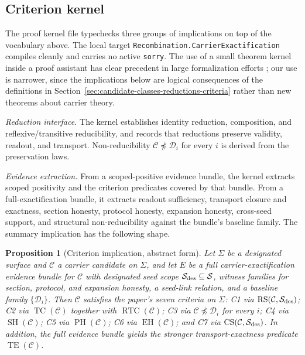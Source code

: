 \documentclass[11pt]{article}
\newtheorem{proposition}[theorem]{Proposition}
\theoremstyle{definition}
\begin{document}
\subsection{Criterion kernel}

The proof kernel file typechecks three groups of implications on top of the
vocabulary above. The local target
\nolinkurl{Recombination.CarrierExactification} compiles cleanly and carries no
active \texttt{sorry}. The use of a small theorem kernel inside a proof assistant
has clear precedent in large formalization efforts \citep{Gonthier2008}; our use is
narrower, since the implications below are
logical consequences of the definitions in
Section~\ref{sec:candidate-classes-reductions-criteria} rather than new theorems
about carrier theory.

\emph{Reduction interface.} The kernel establishes identity reduction,
composition, and reflexive/transitive reducibility, and records that reductions
preserve validity, readout, and transport. Non-reducibility $\mathcal{C}
\not\preceq \mathcal{D}_i$ for every $i$ is derived from the preservation laws.

\emph{Evidence extraction.} From a scoped-positive evidence bundle, the kernel
extracts scoped positivity and the criterion predicates covered by that bundle.
From a full-exactification bundle, it extracts readout sufficiency, transport
closure and exactness, section honesty, protocol honesty, expansion honesty,
cross-seed support, and structural non-reducibility against the bundle's
baseline family. The summary implication has the following shape.

\begin{proposition}[Criterion implication, abstract form]
\label{prop:criterion-implication}
Let $\Sigma$ be a designated surface and $\mathcal{C}$ a carrier candidate on
$\Sigma$, and let $E$ be a full carrier-exactification evidence bundle for
$\mathcal{C}$ with designated seed scope
$\mathcal{S}_{\textup{des}} \subseteq \mathcal{S}$, witness families for section,
protocol, and expansion honesty, a seed-link relation, and a baseline family
$\{\mathcal{D}_i\}$. Then $\mathcal{C}$ satisfies the paper's seven criteria on
$\Sigma$: C1 via $\operatorname{RS}(\mathcal{C}, \mathcal{S}_{\textup{des}})$; C2
via $\operatorname{TC}(\mathcal{C})$ together with
$\operatorname{RTC}(\mathcal{C})$; C3 via $\mathcal{C} \not\preceq \mathcal{D}_i$
for every $i$; C4 via $\operatorname{SH}(\mathcal{C})$; C5 via
$\operatorname{PH}(\mathcal{C})$; C6 via $\operatorname{EH}(\mathcal{C})$; and C7
via $\operatorname{CS}(\mathcal{C}, \mathcal{S}_{\textup{des}})$. In addition, the
full evidence bundle yields the stronger transport-exactness predicate
$\operatorname{TE}(\mathcal{C})$.
\end{proposition}
\end{document}
